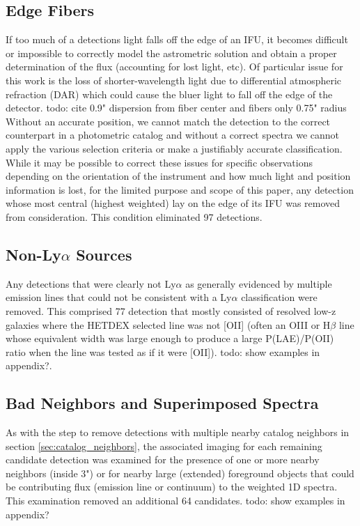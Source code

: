 \documentclass{aastex62}
\begin{document}
\subsection{Edge Fibers}
If too much of a detections light falls off the edge of an IFU, it becomes difficult or impossible to correctly model the astrometric solution and obtain a proper determination of the flux (accounting for lost light, etc). Of particular issue for this work is the loss of shorter-wavelength light due to differential atmospheric refraction (DAR) which could cause the bluer light to fall off the edge of the detector. { \color{red} todo: cite 0.9" dispersion from fiber center and fibers only 0.75" radius} Without an accurate position, we cannot match the detection to the correct counterpart in a photometric catalog and without a correct spectra we cannot apply the various selection criteria or make a justifiably accurate classification. While it may be possible to correct these issues for specific observations depending on the orientation of the instrument and how much light and position information is lost, for the limited purpose and scope of this paper, any detection whose most central (highest weighted) lay on the edge of its IFU was removed from consideration. This condition eliminated 97 detections. 

\subsection{Non-Ly$\alpha$ Sources}
Any detections that were clearly not Ly$\alpha$ as generally evidenced by multiple emission lines that could not be consistent with a Ly$\alpha$ classification were removed. This comprised 77 detection that mostly consisted of resolved low-z galaxies where the HETDEX selected line was not [OII] (often an OIII or H$\beta$ line whose equivalent width was large enough to produce a large P(LAE)/P(OII) ratio when the line was tested as if it were [OII]).
{ \color{red} todo: show examples in appendix?}.  



\subsection{Bad Neighbors and Superimposed Spectra}
As with the step to remove detections with multiple nearby catalog neighbors in section \ref{sec:catalog_neighbors}, the associated imaging for each remaining candidate detection was examined for the presence of one or more nearby neighbors (inside 3") or for nearby large (extended) foreground objects that could be contributing flux (emission line or continuum) to the weighted 1D spectra. This examination removed an additional 64 candidates.
{ \color{red} todo: show examples in appendix?}
\end{document}
